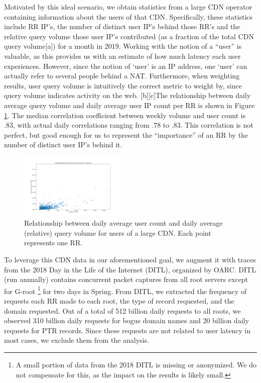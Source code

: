 \documentclass[sigconf,nonacm,10pt]{acmart}
\begin{document}
\label{sec:rr_global_look_data} Motivated by this ideal scenario, we
obtain statistics from a large CDN operator containing information about
the users of that CDN. Specifically, these statistics include RR IP's,
the number of distinct user IP's behind those RR's and the relative
query volume those user IP's contributed (as a fraction of the total CDN
query volume{[}a{]}) for a month in 2019. Working with the notion of a
``user'' is valuable, as this provides us with an estimate of how much
latency each user experiences. However, since the notion of `user' is an
IP address, one `user' can actually refer to several people behind a
NAT. Furthermore, when weighting results, user query volume is
intuitively the correct metric to weight by, since query volume
indicates activity on the web. {[}b{]}{[}c{]}The relationship between
daily average query volume and daily average user IP count per RR is
shown in Figure \ref{fig:query_user_relationship}. The median
correlation coefficient between weekly volume and user count is .83,
with actual daily correlations ranging from .78 to .83. This correlation
is not perfect, but good enough for us to represent the ``importance''
of an RR by the number of distinct user IP's behind it.

\begin{figure}
    \centering
    \includegraphics[width=0.45\textwidth]{figures/query_user_relationship.png}
    \caption{Relationship between daily average user count and daily average (relative) query volume for users of a large CDN. Each point represents one RR.}
    \label{fig:query_user_relationship}
\end{figure}

To leverage this CDN data in our aforementioned goal, we augment it with
traces from the 2018 Day in the Life of the Internet (DITL), organized
by OARC. DITL (run annually) contains concurrent packet captures from
all root servers except for G-root
\footnote{ A small portion of data from the 2018 DITL is missing or anonymized. We do not compensate for this, as the impact on the results is likely small. }
for two days in Spring. From DITL, we extracted the frequency of
requests each RR made to each root, the type of record requested, and
the domain requested. \break
Out of a total of 512 billion daily requests to all roots, we observed
310 billion daily requests for bogus domain names and 20 billion daily
requests for PTR records. Since these requests are not related to user
latency in most cases, we exclude them from the analysis.
\end{document}
